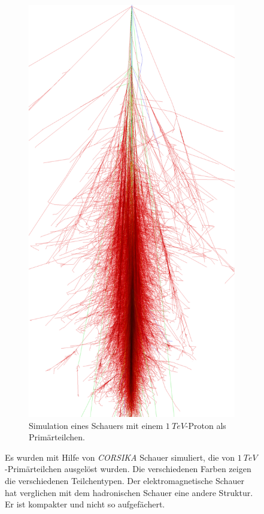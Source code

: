 \begin{figure}
\begin{subfigure}{0.4\textwidth}
 \end{subfigure}
 \hspace{2.0cm}
  \begin{subfigure}{0.4\textwidth}
  \includegraphics[width=\textwidth]{./Plots/03_MonteCarlos/Proton_1TeV_CORSIKA.png}
  \caption{Simulation eines Schauers mit einem $\SI{1}{TeV}$-Proton als Primärteilchen.}
 \end{subfigure}
  \caption{Es wurden mit Hilfe von \textit{CORSIKA} Schauer simuliert, die von $\SI{1}{TeV}$-Primärteilchen ausgelöst wurden. 
  Die verschiedenen Farben zeigen die verschiedenen Teilchentypen.
  Der elektromagnetische Schauer hat verglichen mit dem hadronischen Schauer eine andere Struktur.
  Er ist kompakter und nicht so aufgefächert.\cite{CORSIKA-Bilder}}
  \label{CORSIKA_Schauer}
 \end{figure}



